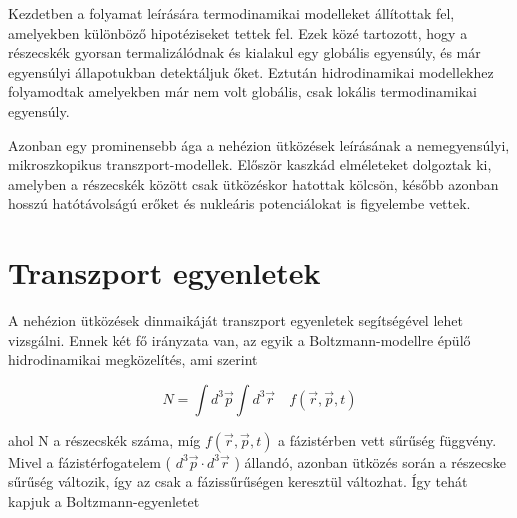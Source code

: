 \documentclass[a4paper,12pt]{article}
\begin{document}
\par Kezdetben a folyamat leírására termodinamikai modelleket állítottak fel, amelyekben különböző hipotéziseket tettek fel. Ezek közé tartozott, hogy a részecskék gyorsan termalizálódnak és kialakul egy globális egyensúly, és már egyensúlyi állapotukban detektáljuk őket. Eztután hidrodinamikai modellekhez folyamodtak amelyekben már nem volt globális, csak lokális termodinamikai egyensúly.

\vspace{5mm}

\par Azonban egy prominensebb ága a nehézion ütközések leírásának a nemegyensúlyi, mikroszkopikus transzport-modellek. Először kaszkád elméleteket dolgoztak ki, amelyben a részecskék között csak ütközéskor hatottak kölcsön, később azonban hosszú hatótávolságú erőket és nukleáris potenciálokat is figyelembe vettek.

\vspace{5mm}

\par 

\vspace{5mm}

\section{Transzport egyenletek}

\par A nehézion ütközések dinmaikáját transzport egyenletek segítségével lehet vizsgálni. Ennek két fő irányzata van, az egyik a Boltzmann-modellre épülő hidrodinamikai megközelítés, ami szerint 

\vspace{5mm}

\begin{equation}
	N = \int d^{3}\vec{p} \int d^{3}\vec{r} \quad f(\vec{r}, \vec{p}, t)
\end{equation}

\vspace{5mm}

ahol N a részecskék száma, míg $f(\vec{r}, \vec{p}, t)$ a fázistérben vett sűrűség függvény. Mivel a fázistérfogatelem ( $d^{3}\vec{p}\cdot d^{3}\vec{r}$ ) állandó, azonban ütközés során a részecske sűrűség változik, így az csak a fázissűrűségen keresztül változhat. Így tehát kapjuk a Boltzmann-egyenletet

\vspace{5mm}
\end{document}
